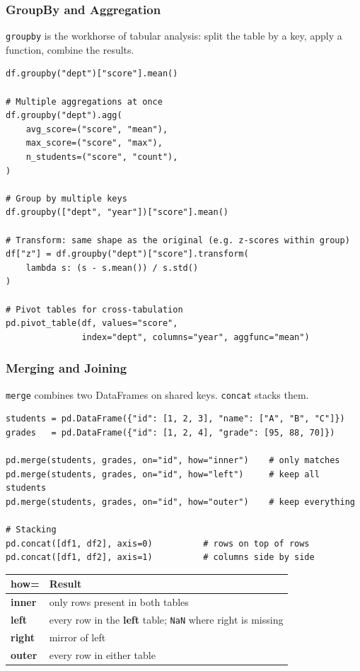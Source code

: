 \documentclass[aspectratio=169,10pt]{beamer}
\newcommand{\keyword}[1]{\textcolor{PrimaryBlue}{\textbf{#1}}}
\newcommand{\codeword}[1]{\texttt{#1}}
\begin{document}
\begin{frame}[fragile]
\frametitle{GroupBy and Aggregation}
\small
\codeword{groupby} is the workhorse of tabular analysis: split the table by a key, apply a function, combine the results.

\vspace{0.12cm}
\begin{lstlisting}[style=pycode]
df.groupby("dept")["score"].mean()

# Multiple aggregations at once
df.groupby("dept").agg(
    avg_score=("score", "mean"),
    max_score=("score", "max"),
    n_students=("score", "count"),
)

# Group by multiple keys
df.groupby(["dept", "year"])["score"].mean()

# Transform: same shape as the original (e.g. z-scores within group)
df["z"] = df.groupby("dept")["score"].transform(
    lambda s: (s - s.mean()) / s.std()
)

# Pivot tables for cross-tabulation
pd.pivot_table(df, values="score",
               index="dept", columns="year", aggfunc="mean")
\end{lstlisting}
\end{frame}


\begin{frame}[fragile]
\frametitle{Merging and Joining}
\small
\codeword{merge} combines two DataFrames on shared keys. \codeword{concat} stacks them.

\vspace{0.12cm}
\begin{lstlisting}[style=pycode]
students = pd.DataFrame({"id": [1, 2, 3], "name": ["A", "B", "C"]})
grades   = pd.DataFrame({"id": [1, 2, 4], "grade": [95, 88, 70]})

pd.merge(students, grades, on="id", how="inner")    # only matches
pd.merge(students, grades, on="id", how="left")     # keep all students
pd.merge(students, grades, on="id", how="outer")    # keep everything

# Stacking
pd.concat([df1, df2], axis=0)          # rows on top of rows
pd.concat([df1, df2], axis=1)          # columns side by side
\end{lstlisting}

\renewcommand{\arraystretch}{1.20}
\begin{tabularx}{\linewidth}{>{\bfseries}p{1.6cm}X}
\toprule
how= & Result \\
\midrule
inner   & only rows present in both tables \\
left    & every row in the \keyword{left} table; \codeword{NaN} where right is missing \\
right   & mirror of left \\
outer   & every row in either table \\
\bottomrule
\end{tabularx}
\end{frame}
\end{document}
